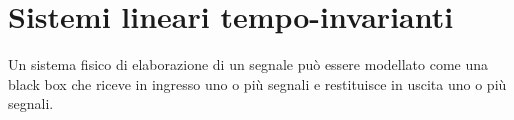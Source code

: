 \chapter{Sistemi lineari tempo-invarianti}
Un sistema fisico di elaborazione di un segnale può essere modellato come una black box che riceve in ingresso uno o più segnali e restituisce in uscita uno o più segnali.
\begin{figure}[h]\centering
{}
\end{figure}

